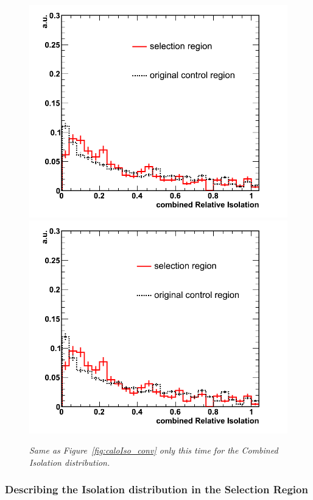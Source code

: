 \begin{figure}[h!]
\centering
\includegraphics[scale=0.32]{Plots/combIso_pt10_conv.png}
\includegraphics[scale=0.32]{Plots/combIso_pt20_conv.png}
\caption{\textit{Same as Figure~\ref{fig:caloIso_conv} only this time for the Combined Isolation distribution.}}\label{fig:combIso_conv}
\end{figure}

\subsubsection{Describing the Isolation distribution in the Selection Region}

